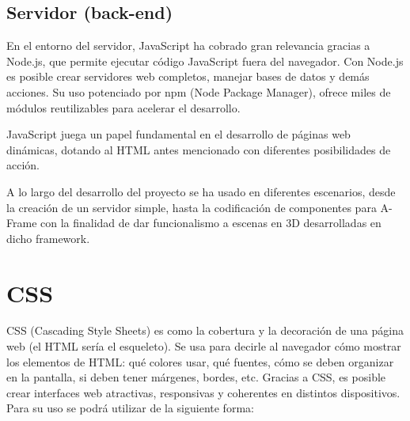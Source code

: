 \documentclass[a4paper, 12pt]{book}
\let\cleardoublepage\clearpage
\begin{document}
\subsection{Servidor (back-end)}
En el entorno del servidor, JavaScript ha cobrado gran relevancia gracias a Node.js, que permite ejecutar código JavaScript fuera del navegador. Con Node.js es posible crear servidores web completos, manejar bases de datos y demás acciones. Su uso potenciado por npm (Node Package Manager), ofrece miles de módulos reutilizables para acelerar el desarrollo.

JavaScript juega un papel fundamental en el desarrollo de páginas web dinámicas, dotando al HTML antes mencionado con diferentes posibilidades de acción.

A lo largo del desarrollo del proyecto se ha usado en diferentes escenarios, desde la creación de un servidor simple, hasta la codificación de componentes para A-Frame con la finalidad de dar funcionalismo a escenas en 3D desarrolladas en dicho framework. 


\cleardoublepage
\section{CSS} 
\label{sec:seccion8}
CSS (Cascading Style Sheets) es como la cobertura y la decoración de una página web (el HTML sería el esqueleto). Se usa para decirle al navegador cómo mostrar los elementos de HTML: qué colores usar, qué fuentes, cómo se deben organizar en la pantalla, si deben tener márgenes, bordes, etc. 
Gracias a CSS, es posible crear interfaces web atractivas, responsivas y coherentes en distintos dispositivos.
Para su uso se podrá utilizar de la siguiente forma:
\end{document}
